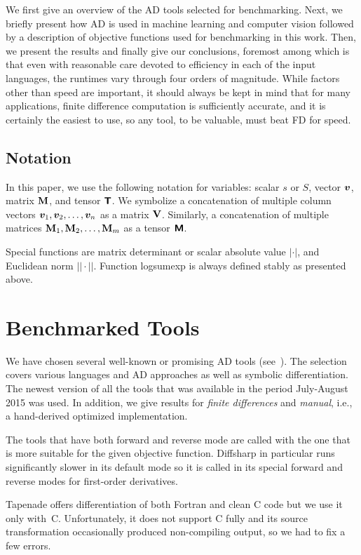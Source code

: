 \documentclass[suppldata]{article}
\begin{document}
We first give an overview of the AD tools selected for benchmarking. Next, we briefly present how AD is used in machine learning and computer vision followed by a description of objective functions used for benchmarking in this work. Then, we present the results and finally give our conclusions, foremost among which is that even with reasonable care devoted to efficiency in each of the input languages, the runtimes vary through four orders of magnitude.  While factors other than speed are important, it should always be kept in mind that for many applications, finite difference computation is sufficiently accurate, and it is certainly the easiest to use, so any tool, to be valuable, must beat FD for speed.

\subsection{Notation}
\label{sec:not}
In this paper, we use the following notation for variables: scalar $s$ or $S$, vector $\bm{v}$, matrix ${\bf M}$, and tensor $\bm{\mathsf T}$. We symbolize a concatenation of multiple column vectors $\bm{v}_1, \bm{v}_2, \dots, \bm{v}_n$ as a matrix ${\bf V}$. Similarly, a concatenation of multiple matrices ${\bf M}_1, {\bf M}_2, \dots, {\bf M}_m$ as a tensor $\bm{\mathsf M}$.

Special functions are matrix determinant or scalar absolute value $|\cdot|$, and Euclidean norm $||\cdot||$. Function logsumexp is always defined stably as presented above.

\section{Benchmarked Tools}
\label{sec:tools}
We have chosen several well-known or promising AD tools (see~). The selection covers various languages and AD approaches as well as symbolic differentiation. The newest version of all the tools that was available in the period July-August 2015 was used. In addition, we give results for \emph{finite differences} and \emph{manual}, i.e., a hand-derived optimized implementation. 

The tools that have both forward and reverse mode are called with the one that is more suitable for the given objective function. Diffsharp in particular runs significantly slower in its default mode so it is called in its special forward and reverse modes for first-order derivatives. 

Tapenade offers differentiation of both Fortran and clean C code but we use it only with~C. Unfortunately, it does not support C fully and its source transformation occasionally produced non-compiling output, so we had to fix a few errors. 
\end{document}
